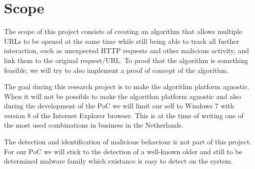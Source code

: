 \documentclass{scrartcl}
\begin{document}




\section{Scope}

The scope of this project consists of creating an algorithm that allows multiple URLs to be opened at the same time while still being able to track all further interaction, such as unexpected HTTP requests and other malicious activity, and link them to the original request/URL. To proof that the algorithm is something feasible, we will try to also implement a proof of concept of the algorithm.

The goal during this research project is to make the algorithm platform agnostic. When it will not be possible to make the algorithm platform agnostic and also during the development of the PoC we will limit our self to Windows 7 with version 8 of the Internet Explorer browser. This is at the time of writing one of the most used combinations in business in the Netherlands.

The detection and identification of malicious behaviour is not part of this project. For our PoC we will stick to the detection of a well-known older and still to be determined malware family which existance is easy to detect on the system. 
\end{document}
